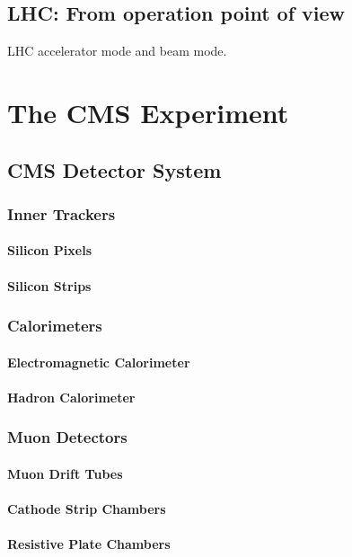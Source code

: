 \subsection{LHC: From operation point of view}
LHC accelerator mode and beam mode. 

\section{The CMS Experiment}

\subsection{CMS Detector System}
\subsubsection{Inner Trackers}
\paragraph{Silicon Pixels}
\paragraph{Silicon Strips}

\subsubsection{Calorimeters}
\paragraph{Electromagnetic Calorimeter}
\paragraph{Hadron Calorimeter}

\subsubsection{Muon Detectors}
\paragraph{Muon Drift Tubes}
\paragraph{Cathode Strip Chambers}
\paragraph{Resistive Plate Chambers}

